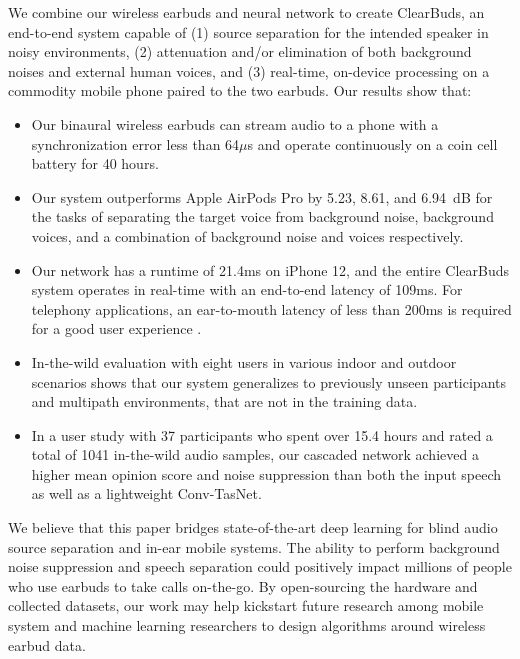 \documentclass [11pt, proquest] {uwthesis}[2020/02/24]
\newcommand{\squishlist}{\begin{itemize}[itemsep=1pt,parsep=2pt,topsep=3pt,partopsep=0pt,leftmargin=0em, itemindent=1em,labelwidth=1em,labelsep=0.5em]}
\newcommand{\squishend}{\end{itemize}}
\begin{document}
We combine our wireless earbuds and neural network to create ClearBuds, an end-to-end system capable of (1) source separation for the intended speaker in noisy environments, (2) attenuation and/or elimination of both background noises and external human voices, and (3) real-time, on-device processing on a commodity mobile phone paired to the  two earbuds.  Our results show that:
\squishlist
    \item Our binaural wireless earbuds  can stream audio to a phone with a synchronization error less than 64$\mu$s and operate  continuously on a coin cell battery for 40 hours.
    \item Our system outperforms Apple AirPods Pro by 5.23, 8.61, and 6.94~dB  for the tasks of  separating the target voice from background noise, background voices, and a combination of background noise and voices respectively.
    \item Our network has a runtime of 21.4ms on iPhone 12, and the entire ClearBuds system operates in real-time with an end-to-end  latency of 109ms.  For telephony applications, an ear-to-mouth latency of less than 200ms is required for a good user experience \cite{g.114}.
    \item In-the-wild evaluation with eight users in various indoor and outdoor scenarios  shows that our system  generalizes to previously unseen participants and multipath environments,  that are not in the training data.  
    \item In a user study with 37  participants who spent over 15.4  hours and rated a total of 1041  in-the-wild  audio samples, our cascaded network achieved a higher mean opinion score and noise suppression  than both the input speech as well as a  lightweight Conv-TasNet. 
    
    
\squishend




We believe that this paper  bridges state-of-the-art deep  learning for blind audio source separation and in-ear mobile systems. The ability to perform background noise suppression and   speech  separation could positively   impact  millions of people who use earbuds to take calls on-the-go. By open-sourcing the hardware  and collected datasets, our work may  help kickstart future research among mobile system and machine learning researchers to design  algorithms around wireless earbud data.
\end{document}
